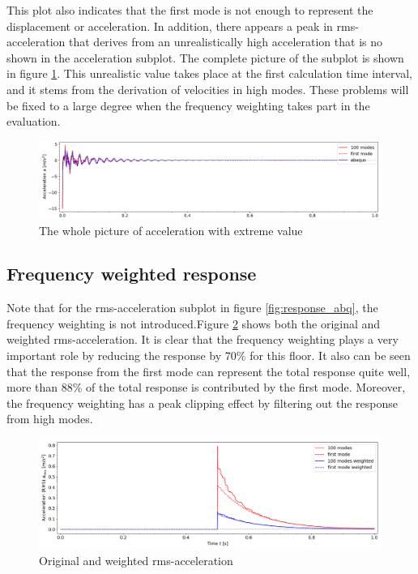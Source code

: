 This plot also indicates that the first mode is not enough to represent the displacement or acceleration. In addition, there appears a peak in rms-acceleration that derives from an unrealistically high acceleration that is no shown in the acceleration subplot. The complete picture of the subplot is shown in figure \ref{fig:acc_whole}. This unrealistic value takes place at the first calculation time interval, and it stems from the derivation of velocities in high modes. These problems will be fixed to a large degree when the frequency weighting takes part in the evaluation. 
\begin{figure}[H]
\centering
\includegraphics[width=1\textwidth]{images/acc_whole}
\caption{The whole picture of acceleration with extreme value}
\label{fig:acc_whole}
\end{figure}

\subsection{Frequency weighted response}
Note that for the rms-acceleration subplot in figure \ref{fig:response_abq}, the frequency weighting is not introduced.Figure \ref{fig:acc_weight} shows both the original and weighted rms-acceleration. It is clear that the frequency weighting plays a very important role by reducing the response by 70\% for this floor. It also can be seen that the response from the first mode can represent the total response quite well, more than 88\% of the total response is contributed by the first mode. Moreover, the frequency weighting has a peak clipping effect by filtering out the response from high modes.

\begin{figure}[H]
\centering
\includegraphics[width=1\textwidth]{images/acc_weight}
\caption{Original and weighted rms-acceleration}
\label{fig:acc_weight}
\end{figure}

